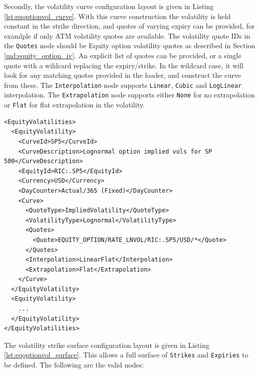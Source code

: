 Secondly, the volatility curve configuration layout is given in Listing \ref{lst:eqoptionvol_curve}. With this curve construction the volatility is held constant in the strike direction, and quotes of varying expiry can be provided, for examlple if only ATM volatility quotes are available. The volatility quote IDs in the \lstinline!Quotes! node should be Equity option volatility quotes as described in Section \ref{md:equity_option_iv}. An explicit list of quotes can be provided, or a single quote with a wildcard replacing the expiry/strike. In the wildcard case, it will look for any matching quotes provided in the loader, and construct the curve from these. The \lstinline!Interpolation! node supports \lstinline!Linear!, \lstinline!Cubic! and \lstinline!LogLinear! interpolation. The \lstinline!Extrapolation! node supports either \lstinline!None! for no extrapolation or \lstinline!Flat! for flat extrapolation in the volatility.

\begin{longlisting}
\begin{verbatim}
<EquityVolatilities>
  <EquityVolatility>
    <CurveId>SP5</CurveId>
    <CurveDescription>Lognormal option implied vols for SP 500</CurveDescription>
    <EquityId>RIC:.SP5</EquityId>
    <Currency>USD</Currency>
    <DayCounter>Actual/365 (Fixed)</DayCounter>
    <Curve>
      <QuoteType>ImpliedVolatility</QuoteType>
      <VolatilityType>Lognormal</VolatilityType>
      <Quotes>
        <Quote>EQUITY_OPTION/RATE_LNVOL/RIC:.SP5/USD/*</Quote>
      </Quotes>
      <Interpolation>LinearFlat</Interpolation>
      <Extrapolation>Flat</Extrapolation>
    </Curve>
  </EquityVolatility>
  <EquityVolatility>
    ...
  </EquityVolatility>
</EquityVolatilities>
\end{verbatim}
\caption{Equity option volatility configuration - curve}
\label{lst:eqoptionvol_curve}
\end{longlisting}

The volatility strike surface configuration layout is given in Listing \ref{lst:eqoptionvol_surface}. This allows a full surface of \lstinline!Strikes! and \lstinline!Expiries! to be defined. The following are the valid nodes:

